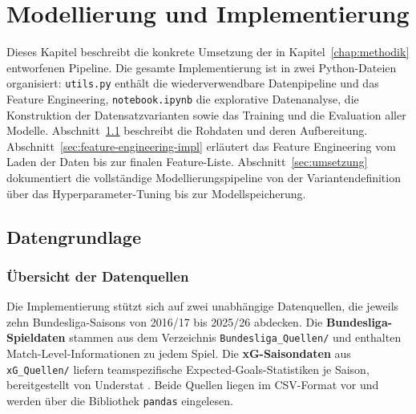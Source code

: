 
\chapter{Modellierung und Implementierung}\label{chap:modellierung}

Dieses Kapitel beschreibt die konkrete Umsetzung der in Kapitel~\ref{chap:methodik}
entworfenen Pipeline. Die gesamte Implementierung ist in zwei Python-Dateien
organisiert: \texttt{utils.py} enthält die wiederverwendbare Datenpipeline und
das Feature Engineering, \texttt{notebook.ipynb} die explorative Datenanalyse,
die Konstruktion der Datensatzvarianten sowie das Training und die Evaluation
aller Modelle. Abschnitt~\ref{sec:datengrundlage} beschreibt die Rohdaten
und deren Aufbereitung. Abschnitt~\ref{sec:feature-engineering-impl} erläutert
das Feature Engineering vom Laden der Daten bis zur finalen Feature-Liste.
Abschnitt~\ref{sec:umsetzung} dokumentiert die vollständige
Modellierungspipeline von der Variantendefinition über das Hyperparameter-Tuning
bis zur Modellspeicherung.

\section{Datengrundlage}
\label{sec:datengrundlage}

\subsection{Übersicht der Datenquellen}

Die Implementierung stützt sich auf zwei unabhängige Datenquellen, die jeweils
zehn Bundesliga-Saisons von 2016/17 bis 2025/26 abdecken. Die
\textbf{Bundesliga-Spieldaten} stammen aus dem Verzeichnis
\texttt{Bundesliga\_Quellen/} und enthalten Match-Level-Informationen zu
jedem Spiel. Die \textbf{xG-Saisondaten} aus \texttt{xG\_Quellen/} liefern
teamspezifische Expected-Goals-Statistiken je Saison, bereitgestellt von
Understat \cite{Understat2024}. Beide Quellen liegen im CSV-Format vor
und werden über die Bibliothek \texttt{pandas} \cite{McKinney2010} eingelesen.

